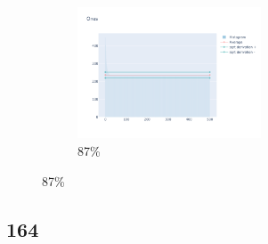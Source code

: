 \documentclass[12pt, fleqn]{report}                             %
\theoremstyle{break}                                            %
\begin{document}
\begin{figure}[ht!]
\begin{subfigure}[b]{0.4\linewidth}
          \includegraphics[width=0.6\textwidth]{Images/162/dia-d.png}
          \caption{87\%}
        \end{subfigure}
      \end{figure}


      \clearpage
      \subsection{164}
\end{document}
